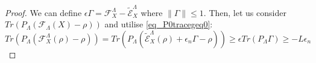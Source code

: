 \documentclass[10pt]{amsart}
\begin{document}
\begin{proof}
We can define $\epsilon\Gamma = \mathcal{F}^{\Lambda}_X - \tilde{\mathcal{E}}^{\Lambda}_X$ where $\|\Gamma\| \leq 1$. Then, let us consider $Tr(P_{\Lambda}(\mathcal{F}_{\Lambda}(X) - \rho))$ and utilise \eqref{eq_P0tracegeq0}:
\begin{equation}
    Tr(P_{\Lambda}(\mathcal{F}^{\Lambda}_X(\rho) - \rho)) = Tr(P_{\Lambda}(\tilde{\mathcal{E}}^{\Lambda}_X(\rho) + \epsilon_n\Gamma - \rho)) \geq \epsilon Tr(P_{\Lambda} \Gamma) \geq -L\epsilon_n
\end{equation}



\end{proof}
\end{document}
